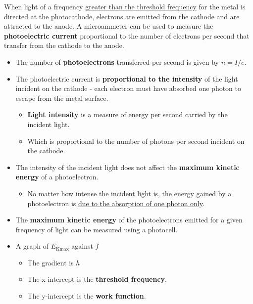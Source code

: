 When light of a frequency \underline{greater than the threshold frequency} for the metal is directed at the photocathode, electrons are emitted from the cathode and are attracted to the anode. A microammeter can be used to measure the \textbf{photoelectric current} proportional to the number of electrons per second that transfer from the cathode to the anode.
\begin{itemize}
    \item The number of \textbf{photoelectrons} transferred per second is given by $n=I/e$.
    \item The photoelectric current is \textbf{proportional to the intensity} of the light incident on the cathode - each electron must have absorbed one photon to escape from the metal surface.
        \begin{itemize}
            \item \textbf{Light intensity} is a measure of energy per second carried by the incident light.
            \item Which is proportional to the number of photons per second incident on the cathode.
        \end{itemize}
    \item The intensity of the incident light does not affect the \textbf{maximum kinetic energy} of a photoelectron.
        \begin{itemize}
            \item No matter how intense the incident light is, the energy gained by a photoelectron is \underline{due to the absorption of one photon only}.
        \end{itemize}
    \item The \textbf{maximum kinetic energy} of the photoelectrons emitted for a given frequency of light can be measured using a photocell.
    \item A graph of $E_\text{Kmax}$ against $f$
        \begin{itemize}
            \item The gradient is $h$
            \item The x-intercept is the \textbf{threshold frequency}.
            \item The y-intercept is the \textbf{work function}.
        \end{itemize}
\end{itemize}
